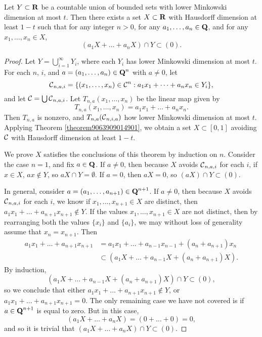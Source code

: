 \begin{theorem}
    Let $Y \subset \operatorname{\mathbf{R}}$ be a countable union of bounded sets with lower Minkowski dimension at most $t$. Then there exists a set $X \subset \operatorname{\mathbf{R}}$ with Hausdorff dimension at least $1 - t$ such that for any integer $n > 0$, for any $a_1, \dots, a_n \in \operatorname{\mathbf{Q}}$, and for any $x_1, \dots, x_n \in X$,
    \[ (a_1X + \dots + a_n X) \cap Y \subset (0). \]
\end{theorem}
\begin{proof}
    Let $Y = \bigcup_{i = 1}^\infty Y_i$, where each $Y_i$ has lower Minkowski dimension at most $t$. For each $n$, $i$, and $a = (a_1, \dots, a_n) \in \operatorname{\mathbf{Q}}^n$ with $a \neq 0$, let
    \[ \operatorname{\mathcal{C}}_{n,a,i} = \{ (x_1, \dots, x_n) \in \operatorname{\mathcal{C}}^n : a_1x_1 + \dots + a_nx_n \in Y_i \}, \]
    and let $\operatorname{\mathcal{C}} = \bigcup \operatorname{\mathcal{C}}_{n,a,i}$. Let $T_{n,a}(x_1,\dots,x_n)$ be the linear map given by
    \[ T_{n,a}(x_1,\dots,x_n) = a_1x_1 + \dots + a_nx_n. \]
    Then $T_{n,a}$ is nonzero, and $T_{n,a}(\operatorname{\mathcal{C}}_{n,i,a})$ how lower Minkowski dimension at most $t$. Applying Theorem \ref{theorem9063909014901}, we obtain a set $X \subset [0,1]$ avoiding $\operatorname{\mathcal{C}}$ with Hausdorff dimension at least $1 - t$.

    We prove $X$ satisfies the conclusions of this theorem by induction on $n$. Consider the case $n = 1$, and fix $a \in \operatorname{\mathbf{Q}}$. If $a \neq 0$, then because $X$ avoids $\operatorname{\mathcal{C}}_{n,a,i}$ for each $i$, if $x \in X$, $ax \not \in Y$, so $aX \cap Y = \emptyset$. If $a = 0$, then $aX = 0$, so $(aX) \cap Y \subset (0)$.

    In general, consider $a = (a_1, \dots, a_{n+1}) \in \operatorname{\mathbf{Q}}^{n+1}$. If $a \neq 0$, then because $X$ avoids $\operatorname{\mathcal{C}}_{n,a,i}$ for each $i$, we know if $x_1, \dots, x_{n+1} \in X$ are distinct, then $a_1 x_1 + \dots + a_{n+1} x_{n+1} \not \in Y$. If the values $x_1, \dots, x_{n+1} \in X$ are not distinct, then by rearranging both the values $\{ x_i \}$ and $\{ a_i \}$, we may without loss of generality assume that $x_n = x_{n+1}$. Then
    \begin{align*}
        a_1 x_1 + \dots + a_{n+1} x_{n+1} &= a_1 x_1 + \dots + a_{n-1} x_{n-1} + (a_n + a_{n+1}) x_n\\
        &\subset (a_1 X + \dots + a_{n-1} X + (a_n + a_{n+1}) X).
    \end{align*}
    By induction,
    \[ (a_1 X + \dots + a_{n-1} X + (a_n + a_{n+1}) X) \cap Y \subset (0), \]
    so we conclude that either $a_1 x_1 + \dots + a_{n+1} x_{n+1} \not \in Y$, or $a_1x_1 + \dots + a_{n+1} x_{n+1} = 0$. The only remaining case we have not covered is if $a \in \operatorname{\mathbf{Q}}^{n+1}$ is equal to zero. But in this case,
    \[ (a_1 X + \dots + a_n X) = (0 + \dots + 0) = 0, \]
    and so it is trivial that $(a_1 X + \dots + a_n X) \cap Y \subset (0)$.
\end{proof}

